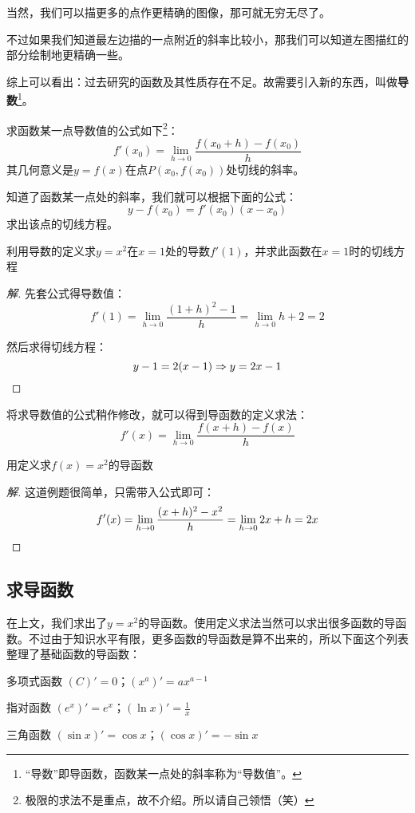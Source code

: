 当然，我们可以描更多的点作更精确的图像，那可就无穷无尽了。

不过如果我们知道最左边描的一点附近的斜率比较小，那我们可以知道左图描红的部分绘制地更精确一些。

综上可以看出：过去研究的函数及其性质存在不足。故需要引入新的东西，叫做\textbf{导数}\footnote{“导数”即导函数，函数某一点处的斜率称为“导数值”。}。

求函数某一点导数值的公式如下\footnote{极限的求法不是重点，故不介绍。所以请自己领悟（笑）}：\[f'(x_0)=\lim_{h\rightarrow 0}\frac{f(x_0+h)-f(x_0)}{h}\]其几何意义是$y=f(x)$在点$P(x_0, f(x_0))$处切线的斜率。

知道了函数某一点处的斜率，我们就可以根据下面的公式：\[y-f(x_0)=f'(x_0)(x-x_0)\]求出该点的切线方程。

\begin{example}
	利用导数的定义求$y=x^2$在$x=1$处的导数$f'(1)$，并求此函数在$x=1$时的切线方程
\end{example}
\begin{proof}[解]
	先套公式得导数值：\[f'(1)=\lim_{h\rightarrow 0}\frac{(1+h)^2-1}{h}=\lim_{h\rightarrow 0}h+2=2\]

	然后求得切线方程：\[y-1=2(x-1)\Rightarrow y=2x-1\qedhere\]
\end{proof}

将求导数值的公式稍作修改，就可以得到导函数的定义求法：\[f'(x)=\lim_{h\rightarrow 0}\frac{f(x+h)-f(x)}{h}\]

\begin{example}
	用定义求$f(x)=x^2$的导函数
\end{example}
\begin{proof}[解]
	这道例题很简单，只需带入公式即可：\[f'(x)=\lim_{h\rightarrow 0}\frac{(x+h)^2-x^2}{h}=\lim_{h\rightarrow 0}2x+h=2x\qedhere\]
\end{proof}

\subsection{求导函数}
在上文，我们求出了$y=x^2$的导函数。使用定义求法当然可以求出很多函数的导函数。不过由于知识水平有限，更多函数的导函数是算不出来的，所以下面这个列表整理了基础函数的导函数：

\begin{desclist}
	\item[多项式函数] $(C)'=0$；$(x^a)'=ax^{a-1}$
	\item[指对函数] $(e^x)'=e^x$；$(\ln x)'=\frac{1}{x}$
	\item[三角函数] $(\sin x)'=\cos x$；$(\cos x)'=-\sin x$
\end{desclist}

